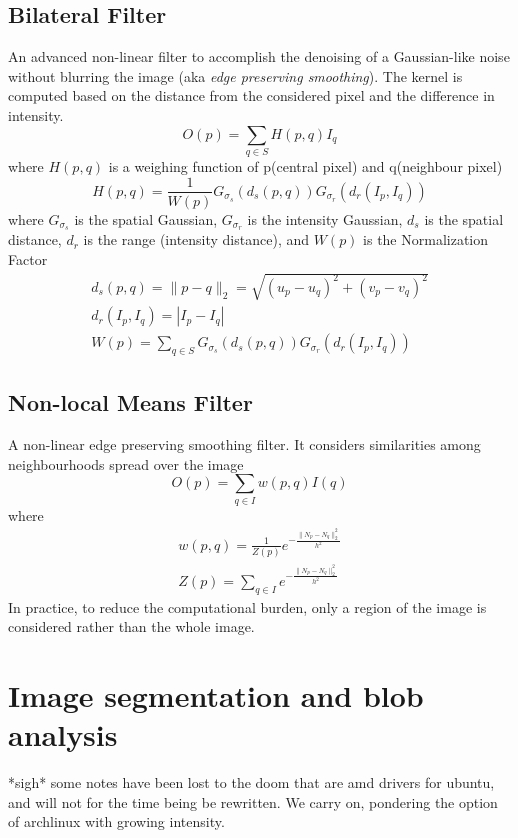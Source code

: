 \documentclass{article}
\begin{document}
\subsection{Bilateral Filter}
An advanced non-linear filter to accomplish the denoising of a Gaussian-like noise without blurring the image (aka \emph{edge preserving smoothing}). The kernel is computed based on the distance from the considered pixel and the difference in intensity.
\[
    O(p)=\sum_{q\in S} H(p,q)I_q
\]
where $H(p,q)$ is a weighing function of p(central pixel) and q(neighbour pixel)
\[
    H(p,q) = \frac{1}{W(p)}G_{\sigma_s}(d_s(p,q))G_{\sigma_r}(d_r(I_p,I_q))
\]
where $G_{\sigma_s}$ is the spatial Gaussian, $G_{\sigma_r}$ is the intensity Gaussian, $d_s$ is the spatial distance, $d_r$ is the range (intensity distance), and $W(p)$ is the Normalization Factor
\begin{gather*}
    d_s(p,q) = \|p-q\|_2 = \sqrt{(u_p-u_q)^2+(v_p-v_q)^2}\\
    d_r(I_p,I_q) = |I_p-I_q|\\
    W(p)= \sum_{q\in S} G_{\sigma_s}(d_s(p,q))G_{\sigma_r}(d_r(I_p,I_q))
\end{gather*}
\subsection{Non-local Means Filter}
A non-linear edge preserving smoothing filter. It considers similarities among neighbourhoods spread over the image
\[
    O(p) = \sum_{q\in I}w(p,q)I(q)
\]
where
\begin{gather*}
    w(p,q)=\frac{1}{Z(p)}e^{-\frac{\|N_p-N_q\|^2_2}{h^2}}\\
    Z(p) = \sum_{q\in I} e^{-\frac{\|N_p-N_q\|^2_2}{h^2}}
\end{gather*}
In practice, to reduce the computational burden, only a region of the image is considered rather than the whole image.






\section{Image segmentation and blob analysis} 
*sigh* some notes have been lost to the doom that are amd drivers for ubuntu, and will not for the time being be rewritten. We carry on, pondering the option of archlinux with growing intensity.
\end{document}
